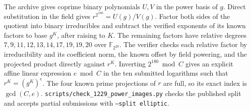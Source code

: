 \documentclass[11pt]{article}
\begin{document}
The archive gives coprime binary polynomials \(U,V\) in the power
basis of \(g\). Direct substitution in the field gives
\(r^{2^{180}}=U(g)/V(g)\). Factor both sides of the quotient into
binary irreducibles and subtract the verified exponents of its known
factors to base \(g^K\), after raising to \(K\). The remaining
factors have relative degrees \(7,9,11,12,13,14,17,19,19,20\)
over \(\mathbb F_{2^{20}}\). The verifier checks each relative
factor by irreducibility and its coefficient norm, the known offset
by field powering, and the projected product directly against
\(r^K\). Inverting \(2^{180}\bmod C\) gives an explicit affine
linear expression \(e\bmod C\) in the ten submitted logarithms
such that \(r^K=(g^K)^e\). The four known prime projections of
\(r\) are full, so its exact index is \(\gcd(C,e)\).
\nolinkurl{scripts/check_1229_power_images.py} checks the published
split and accepts partial submissions with \texttt{--split elliptic}.
\end{document}

